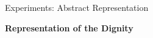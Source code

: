 \documentclass[aspectratio=169, 9pt]{beamer}
\theoremstyle{definition}
\begin{document}
\begin{frame}{Experiments: Abstract Representation}
  \begin{center}
    \bf Representation of the Dignity
  \end{center}
  \begin{columns}
    \begin{column}{0.5\textwidth}
      \begin{figure}[h!]
        \centering
      \end{figure}
    \end{column}
    \begin{column}{0.5\textwidth}
      \begin{figure}[h!]
        \centering
      \end{figure}
    \end{column}
  \end{columns}
\end{frame}
\end{document}
